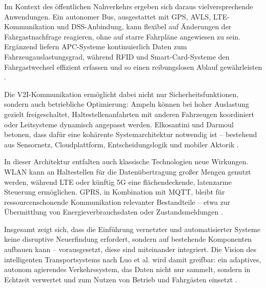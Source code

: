 Im Kontext des öffentlichen Nahverkehrs ergeben sich daraus vielversprechende Anwendungen. Ein autonomer Bus, ausgestattet mit GPS, AVLS, LTE-Kommunikation und DSS-Anbindung, kann flexibel auf Änderungen der Fahrgastnachfrage reagieren, ohne auf starre Fahrpläne angewiesen zu sein. Ergänzend liefern APC-Systeme kontinuierlich Daten zum Fahrzeugauslastungsgrad, während RFID und Smart-Card-Systeme den Fahrgastwechsel effizient erfassen und so einen reibungslosen Ablauf gewährleisten \cite{Amoroso2011, Li2019}.

Die V2I-Kommunikation ermöglicht dabei nicht nur Sicherheitsfunktionen, sondern auch betriebliche Optimierung: Ampeln können bei hoher Auslastung gezielt freigeschaltet, Haltestellenanfahrten mit anderen Fahrzeugen koordiniert oder Leitsysteme dynamisch angepasst werden. Elkosantini und Darmoul betonen, dass dafür eine kohärente Systemarchitektur notwendig ist – bestehend aus Sensornetz, Cloudplattform, Entscheidungslogik und mobiler Aktorik \cite{Elkosantini2013}.

In dieser Architektur entfalten auch klassische Technologien neue Wirkungen. WLAN kann an Haltestellen für die Datenübertragung großer Mengen genutzt werden, während LTE oder künftig 5G eine flächendeckende, latenzarme Steuerung ermöglichen. GPRS, in Kombination mit MQTT, bleibt für ressourcenschonende Kommunikation relevanter Bestandteile – etwa zur Übermittlung von Energieverbrauchsdaten oder Zustandsmeldungen \cite{SacotoCabrera2017}.

Insgesamt zeigt sich, dass die Einführung vernetzter und automatisierter Systeme keine disruptive Neuerfindung erfordert, sondern auf bestehende Komponenten aufbauen kann – vorausgesetzt, diese sind miteinander integriert. Die Vision des intelligenten Transportsystems nach Luo et al. wird damit greifbar: ein adaptives, autonom agierendes Verkehrssystem, das Daten nicht nur sammelt, sondern in Echtzeit verwertet und zum Nutzen von Betrieb und Fahrgästen einsetzt \cite{Luo2019}.